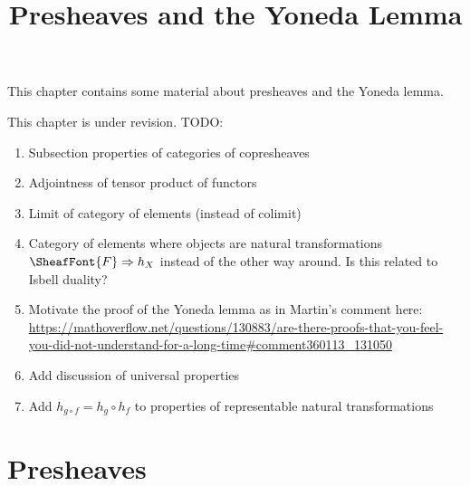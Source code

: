 

%



\title{Presheaves and the Yoneda Lemma}

\maketitle

\label{section-phantom}

This chapter contains some material about presheaves and the Yoneda lemma.

This chapter is under revision. TODO:
\begin{enumerate}
    \item Subsection properties of categories of copresheaves
    \item Adjointness of tensor product of functors
    \item Limit of category of elements (instead of colimit)
    \item Category of elements where objects are natural transformations $\SheafFont{F}\Rightarrow h_{X}$ instead of the other way around. Is this related to Isbell duality?
    \item Motivate the proof of the Yoneda lemma as in Martin's comment here: \url{https://mathoverflow.net/questions/130883/are-there-proofs-that-you-feel-you-did-not-understand-for-a-long-time#comment360113_131050}
    \item Add discussion of universal properties
    \item Add $h_{g\circ f}=h_{g}\circ h_{f}$ to properties of representable natural transformations
\end{enumerate}

\ChapterTableOfContents

\section{Presheaves}\label{section-presheaves}
